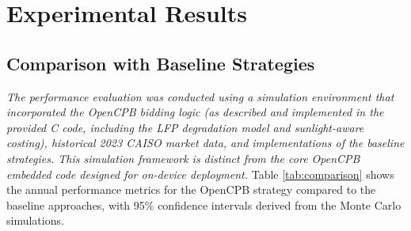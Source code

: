 \documentclass[11pt,a4paper]{article}
\begin{document}
\section{Experimental Results}
\subsection{Comparison with Baseline Strategies}
\textit{The performance evaluation was conducted using a simulation environment that incorporated the OpenCPB bidding logic (as described and implemented in the provided C code, including the LFP degradation model and sunlight-aware costing), historical 2023 CAISO market data, and implementations of the baseline strategies. This simulation framework is distinct from the core OpenCPB embedded code designed for on-device deployment.}
Table \ref{tab:comparison} shows the annual performance metrics for the OpenCPB strategy compared to the baseline approaches, with 95\% confidence intervals derived from the Monte Carlo simulations.
\end{document}
